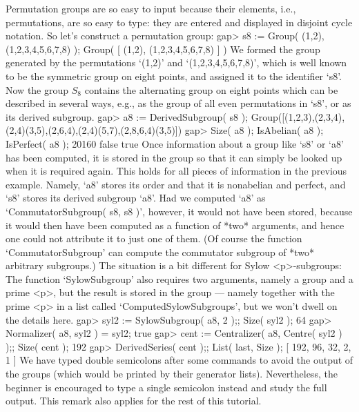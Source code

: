 Permutation  groups  are so easy to  input  because their elements, i.e.,
permutations,  are  so easy to  type: they  are  entered and displayed in
disjoint cycle notation. So let's construct a permutation group:
\beginexample
gap> s8 := Group( (1,2), (1,2,3,4,5,6,7,8) );
Group( [ (1,2), (1,2,3,4,5,6,7,8) ] )
\endexample
We formed the group generated by the permutations `(1,2)' and
`(1,2,3,4,5,6,7,8)', which is well known to be the symmetric group on
eight points, and assigned it to the identifier `s8'.  Now the group
$S_8$ contains the alternating group on eight points which can be
described in several ways, e.g., as the group of all even permutations
in `s8', or as its derived subgroup.
\beginexample
gap> a8 := DerivedSubgroup( s8 );
Group([(1,2,3),(2,3,4),(2,4)(3,5),(2,6,4),(2,4)(5,7),(2,8,6,4)(3,5)])
gap> Size( a8 ); IsAbelian( a8 ); IsPerfect( a8 );
20160
false
true
\endexample
Once information about a group like `s8' or `a8' has been computed, it
is stored in the group so that  it can simply be looked  up when it is
required  again.   This holds for  all pieces   of  information in the
previous  example.  Namely,  `a8'  stores its  order and  that   it is
nonabelian  and perfect,  and `s8'  stores its  derived subgroup `a8'.
Had we computed `a8' as  `CommutatorSubgroup( s8,  s8 )', however,  it
would not have been stored,  because it would  then have been computed
as a function of *two* arguments, and hence one could not attribute it
to just one of them. (Of course  the function `CommutatorSubgroup' can
compute the commutator  subgroup  of *two* arbitrary  subgroups.)  The
situation is  a bit  different for  Sylow  <p>-subgroups: The function
`SylowSubgroup' also  requires  two arguments,  namely a   group and a
prime <p>, but the result is  stored in the  group --- namely together
with the prime  <p> in a  list called `ComputedSylowSubgroups', but we
won't dwell on the details here.
\beginexample
gap> syl2 := SylowSubgroup( a8, 2 );; Size( syl2 );
64
gap> Normalizer( a8, syl2 ) = syl2;
true
gap> cent := Centralizer( a8, Centre( syl2 ) );; Size( cent );
192
gap> DerivedSeries( cent );; List( last, Size );
[ 192, 96, 32, 2, 1 ]
\endexample
We have typed double semicolons  after some commands  to avoid the output
of the  groups   (which would  be  printed  by their  generator   lists).
Nevertheless, the beginner  is  encouraged to   type  a single  semicolon
instead and study the full output. This  remark also applies for the rest
of this tutorial.

